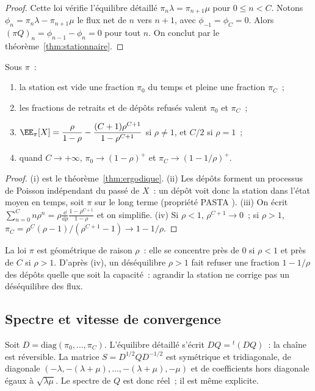 \begin{proof}
Cette loi vérifie l'équilibre détaillé $\pi_n\lambda=\pi_{n+1}\mu$ pour $0\leq n<C$. Notons $\phi_n=\pi_n\lambda-\pi_{n+1}\mu$ le flux net de $n$ vers $n+1$, avec $\phi_{-1}=\phi_C=0$. Alors $(\pi Q)_n=\phi_{n-1}-\phi_n=0$ pour tout $n$. On conclut par le théorème~\ref{thm:stationnaire}.
\end{proof}

\begin{corollaire}\label{cor:indicateurs}
Sous $\pi$~:
\begin{enumerate}[label=(\roman*)]
\item la station est vide une fraction $\pi_0$ du temps et pleine une fraction $\pi_C$~;
\item les fractions de retraits et de dépôts refusés valent $\pi_0$ et $\pi_C$~;
\item $\EE_\pi[X]=\dfrac{\rho}{1-\rho}-\dfrac{(C+1)\rho^{C+1}}{1-\rho^{C+1}}$ si $\rho\neq1$, et $C/2$ si $\rho=1$~;
\item quand $C\to+\infty$, $\pi_0\to(1-\rho)^+$ et $\pi_C\to(1-1/\rho)^+$.
\end{enumerate}
\end{corollaire}

\begin{proof}
(i) est le théorème~\ref{thm:ergodique}. (ii) Les dépôts forment un processus de Poisson indépendant du passé de $X$~: un dépôt voit donc la station dans l'état moyen en temps, soit $\pi$ sur le long terme (propriété PASTA \cite{Wol82}). (iii) On écrit $\sum_{n=0}^Cn\rho^n=\rho\frac{\dd}{\dd\rho}\frac{1-\rho^{C+1}}{1-\rho}$ et on simplifie. (iv) Si $\rho<1$, $\rho^{C+1}\to0$~; si $\rho>1$, $\pi_C=\rho^C(\rho-1)/(\rho^{C+1}-1)\to1-1/\rho$.
\end{proof}

La loi $\pi$ est géométrique de raison $\rho$~: elle se concentre près de $0$ si $\rho<1$ et près de $C$ si $\rho>1$. D'après (iv), un déséquilibre $\rho>1$ fait refuser une fraction $1-1/\rho$ des dépôts quelle que soit la capacité~: agrandir la station ne corrige pas un déséquilibre des flux.

\subsection{Spectre et vitesse de convergence}\label{sec:spectre}

Soit $D=\mathrm{diag}(\pi_0,\dots,\pi_C)$. L'équilibre détaillé s'écrit $DQ={}^t(DQ)$~: la chaîne est réversible. La matrice $S=D^{1/2}QD^{-1/2}$ est symétrique et tridiagonale, de diagonale $(-\lambda,-(\lambda+\mu),\dots,-(\lambda+\mu),-\mu)$ et de coefficients hors diagonale égaux à $\sqrt{\lambda\mu}$. Le spectre de $Q$ est donc réel~; il est même explicite.

